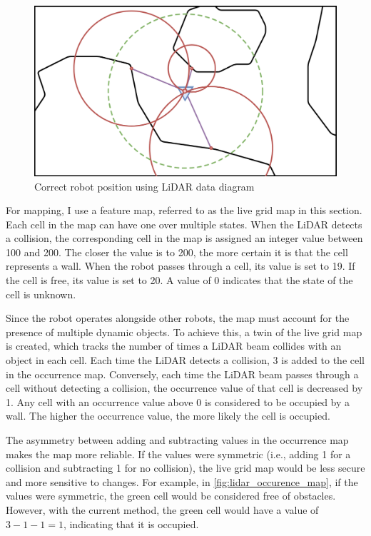 \documentclass[../main.tex]{subfiles}
\begin{document}
\begin{figure}[H]
	\centering
	\includegraphics[width=0.6\linewidth]{IMAGES/part2/lidar_correct_pos.png}
	\caption{Correct robot position using LiDAR data diagram}
	\label{fig:lidar_loca}
\end{figure}


For mapping, I use a feature map, referred to as the live grid map in this section. Each cell in the map can have one over multiple states. When the LiDAR detects a collision, the corresponding cell in the map is assigned an integer value between 100 and 200. The closer the value is to 200, the more certain it is that the cell represents a wall. When the robot passes through a cell, its value is set to 19. If the cell is free, its value is set to 20. A value of 0 indicates that the state of the cell is unknown.

\vspace{1em}

Since the robot operates alongside other robots, the map must account for the presence of multiple dynamic objects. To achieve this, a twin of the live grid map is created, which tracks the number of times a LiDAR beam collides with an object in each cell. Each time the LiDAR detects a collision, 3 is added to the cell in the occurrence map. Conversely, each time the LiDAR beam passes through a cell without detecting a collision, the occurrence value of that cell is decreased by 1. Any cell with an occurrence value above 0 is considered to be occupied by a wall. The higher the occurrence value, the more likely the cell is occupied.

\vspace{1em}

The asymmetry between adding and subtracting values in the occurrence map makes the map more reliable. If the values were symmetric (i.e., adding 1 for a collision and subtracting 1 for no collision), the live grid map would be less secure and more sensitive to changes. For example, in \autoref{fig:lidar_occurence_map}, if the values were symmetric, the green cell would be considered free of obstacles. However, with the current method, the green cell would have a value of $3-1-1=1$, indicating that it is occupied.
\end{document}
